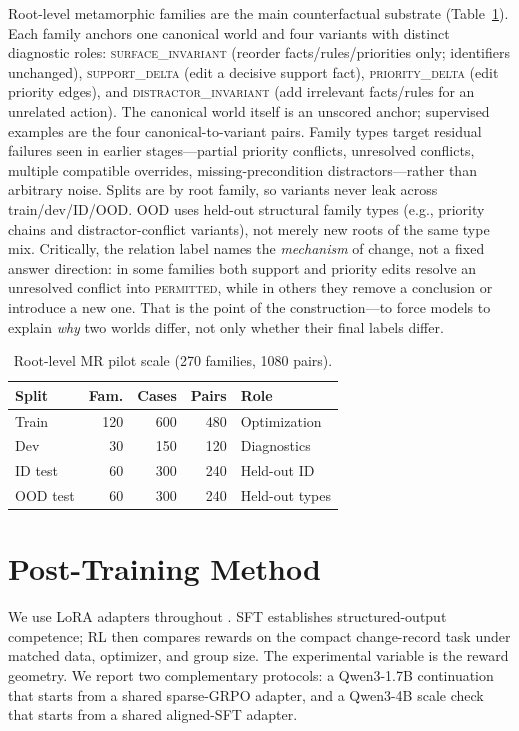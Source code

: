 \documentclass[letterpaper]{article}
\newcommand{\lab}[1]{\textsc{#1}}
\begin{document}
Root-level metamorphic families are the main counterfactual substrate (Table~\ref{tab:scale}). Each family anchors one canonical world and four variants with distinct diagnostic roles: \lab{surface\_invariant} (reorder facts/rules/priorities only; identifiers unchanged), \lab{support\_delta} (edit a decisive support fact), \lab{priority\_delta} (edit priority edges), and \lab{distractor\_invariant} (add irrelevant facts/rules for an unrelated action). The canonical world itself is an unscored anchor; supervised examples are the four canonical-to-variant pairs. Family types target residual failures seen in earlier stages---partial priority conflicts, unresolved conflicts, multiple compatible overrides, missing-precondition distractors---rather than arbitrary noise. Splits are by root family, so variants never leak across train/dev/ID/OOD. OOD uses held-out structural family types (e.g., priority chains and distractor-conflict variants), not merely new roots of the same type mix. Critically, the relation label names the \emph{mechanism} of change, not a fixed answer direction: in some families both support and priority edits resolve an unresolved conflict into \lab{permitted}, while in others they remove a conclusion or introduce a new one. That is the point of the construction---to force models to explain \emph{why} two worlds differ, not only whether their final labels differ.

\begin{table}[t]
\centering
\small
\begin{tabular}{lrrrl}
\toprule
Split & Fam. & Cases & Pairs & Role \\
\midrule
Train & 120 & 600 & 480 & Optimization \\
Dev & 30 & 150 & 120 & Diagnostics \\
ID test & 60 & 300 & 240 & Held-out ID \\
OOD test & 60 & 300 & 240 & Held-out types \\
\bottomrule
\end{tabular}
\caption{Root-level MR pilot scale (270 families, 1080 pairs).}
\label{tab:scale}
\end{table}

\section{Post-Training Method}

We use LoRA adapters throughout \cite{hu2021lora}. SFT establishes structured-output competence; RL then compares rewards on the compact change-record task under matched data, optimizer, and group size. The experimental variable is the reward geometry. We report two complementary protocols: a Qwen3-1.7B continuation that starts from a shared sparse-GRPO adapter, and a Qwen3-4B scale check that starts from a shared aligned-SFT adapter.
\end{document}
